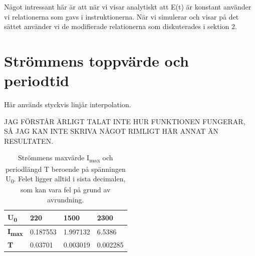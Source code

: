 \documentclass[a4paper, titlepage, 11pt]{article}
\begin{document}
Något intressant här är att när vi visar analytiskt att E(t) är konstant använder vi relationerna som gavs i instruktionerna. När vi simulerar och visar på det sättet använder vi de modifierade relationerna som diskuterades i sektion 2.

\section{Strömmens toppvärde och periodtid}
Här används styckvis linjär interpolation.

JAG FÖRSTÅR ÄRLIGT TALAT INTE HUR FUNKTIONEN FUNGERAR, SÅ JAG KAN INTE SKRIVA NÅGOT RIMLIGT HÄR ANNAT ÄN RESULTATEN.

\begin{table}[H]
\caption{Strömmens maxvärde I\textsubscript{max} och periodlängd T beroende på spänningen U\textsubscript{0}. Felet ligger alltid i sista decimalen, som kan vara fel på grund av avrundning.}
\begin{center}
\begin{tabular}{l|lll}
\hline
\textbf{U\textsubscript{0}}   & 220    & 1500   & 2300   \\ \hline
\textbf{I\textsubscript{max}} & 0.187553 & 1.997132 & 6.5386 \\
\textbf{T}    & 0.03701  & 0.003019 & 0.002285
\end{tabular}
\end{center}
\end{table}
\end{document}
